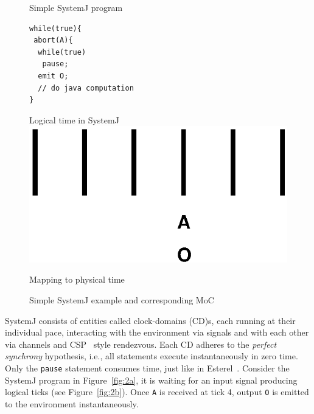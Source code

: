 \begin{figure}[bth]
\centering
\begin{SubFloat}{\label{fig:2a}Simple SystemJ program}%
\begin{minipage}[b]{0.3\linewidth}%
\begin{verbatim}
while(true){
 abort(A){
  while(true)
   pause;
  emit O;
  // do java computation
}
\end{verbatim}%
\end{minipage}%
\end{SubFloat}
\hspace{1.5cm}%
\begin{SubFloat}{\label{fig:2b}Logical time in SystemJ}%
\includegraphics[scale=0.4]{moc}
\end{SubFloat}%
\begin{SubFloat}{\label{fig:2c}Mapping to physical time}%
\scalebox{0.4}{}
\end{SubFloat}%
\caption{Simple SystemJ example and corresponding MoC}
\label{fig:2}
\end{figure}

SystemJ consists of entities called clock-domains (CD)s, each running at
their individual pace, interacting with the environment via signals and
with each other via channels and CSP~\cite{pwel05} style
rendezvous. Each CD adheres to the \textit{perfect synchrony}
hypothesis, i.e., all statements execute instantaneously in zero
time. Only the \texttt{pause} statement consumes time, just like in
Esterel~\cite{gber931}. Consider the SystemJ program in
Figure~\ref{fig:2a}, it is waiting for an input signal producing logical
ticks (see Figure~\ref{fig:2b}). Once \texttt{A} is received at tick 4,
output \texttt{O} is emitted to the environment instantaneously.

